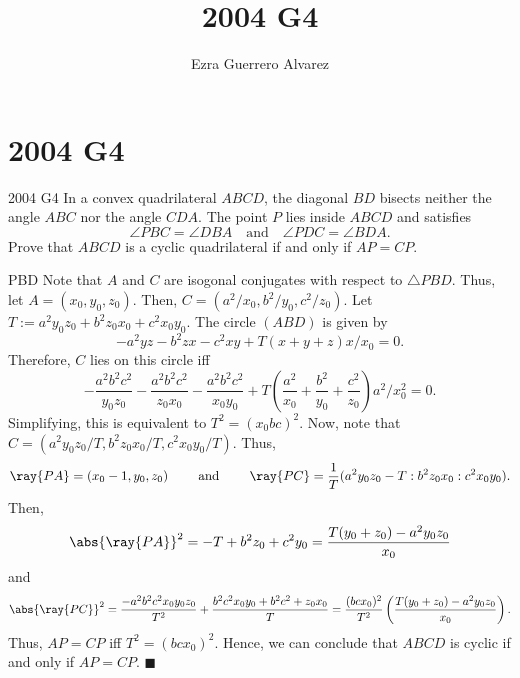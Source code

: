 \documentclass[14pt]{article}
\title{2004 G4}
\author{Ezra Guerrero Alvarez}
\begin{document}
\maketitle
	
\section*{2004 G4}

\begin{statement}{2004 G4}
	In a convex quadrilateral $ABCD$,
	the diagonal $BD$ bisects neither the angle $ABC$ nor the angle $CDA$.
	The point $P$ lies inside $ABCD$ and satisfies
	\[\angle PBC=\angle DBA \quad\text{and}\quad \angle PDC=\angle BDA. \]
	Prove that $ABCD$ is a cyclic quadrilateral
	if and only if $AP=CP$.
\end{statement}
\bary PBD Note that $A$ and $C$ are isogonal conjugates with respect to $\triangle PBD$. Thus, let $A=(x_0,y_0,z_0)$. Then, $C=(a^2/x_0,b^2/y_0,c^2/z_0)$. Let $T:=a^2y_0z_0+b^2z_0x_0+c^2x_0y_0$. The circle $(ABD)$ is given by
\[ -a^2yz-b^2zx-c^2xy+T(x+y+z)x/x_0=0. \]
Therefore, $C$ lies on this circle iff 
\[ -\frac{a^2b^2c^2}{y_0z_0}-\frac{a^2b^2c^2}{z_0x_0}-\frac{a^2b^2c^2}{x_0y_0}+T\left(\frac{a^2}{x_0}+\frac{b^2}{y_0}+\frac{c^2}{z_0}\right)a^2/x_0^2=0. \]
Simplifying, this is equivalent to $T^2=(x_0bc)^2$. Now, note that $C=(a^2y_0z_0/T,b^2z_0x_0/T,c^2x_0y_0/T)$. Thus,
\[ \ray{PA}=(x_0-1,y_0,z_0)\qquad\text{ and }\qquad\ray{PC}=\frac1T(a^2y_0z_0-T:b^2z_0x_0:c^2x_0y_0). \]
Then, 
\[ \abs{\ray{PA}}^2=-T+b^2z_0+c^2y_0=\frac{T(y_0+z_0)-a^2y_0z_0}{x_0} \]
and
\[ \abs{\ray{PC}}^2=\frac{-a^2b^2c^2x_0y_0z_0}{T^2}+\frac{b^2c^2x_0y_0+b^2c^2+z_0x_0}T=\frac{(bcx_0)^2}{T^2}\left(\frac{T(y_0+z_0)-a^2y_0z_0}{x_0}\right). \]
Thus, $AP=CP$ iff $T^2=(bcx_0)^2$. Hence, we can conclude that $ABCD$ is cyclic if and only if $AP=CP$. $\blacksquare$
	
\end{document}
